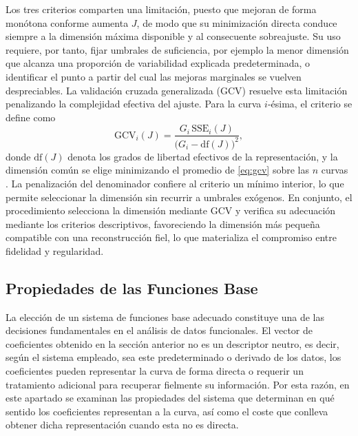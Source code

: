 Los tres criterios comparten una limitación, puesto que mejoran de forma monótona conforme aumenta $J$, de modo que su minimización directa conduce siempre a la dimensión máxima disponible y al consecuente sobreajuste. Su uso requiere, por tanto, fijar umbrales de suficiencia, por ejemplo la menor dimensión que alcanza una proporción de variabilidad explicada predeterminada, o identificar el punto a partir del cual las mejoras marginales se vuelven despreciables. La validación cruzada generalizada (GCV) resuelve esta limitación penalizando la complejidad efectiva del ajuste. Para la curva $i$-ésima, el criterio se define como
\begin{equation}\label{eq:gcv}
    \mathrm{GCV}_i(J) = \frac{G_i\,\mathrm{SSE}_i(J)}
    {\bigl(G_i - \mathrm{df}(J)\bigr)^{2}},
\end{equation}
donde $\mathrm{df}(J)$ denota los grados de libertad efectivos de la representación, y la dimensión común se elige minimizando el promedio de \eqref{eq:gcv} sobre las $n$ curvas \citep{02_01_ramsay2006functional}. La penalización del denominador confiere al criterio un mínimo interior, lo que permite seleccionar la dimensión sin recurrir a umbrales exógenos. En conjunto, el procedimiento selecciona la dimensión mediante GCV y verifica su adecuación mediante los criterios descriptivos, favoreciendo la dimensión más pequeña compatible con una reconstrucción fiel, lo que materializa el compromiso entre fidelidad y regularidad.

\subsection{Propiedades de las Funciones Base}
\label{02_01_02_propiedades_funciones_base}
La elección de un sistema de funciones base adecuado constituye una de las decisiones fundamentales en el análisis de datos funcionales. El vector de coeficientes obtenido en la sección anterior no es un descriptor neutro, es decir, según el sistema empleado, sea este predeterminado o derivado de los datos, los coeficientes pueden representar la curva de forma directa o requerir un tratamiento adicional para recuperar fielmente su información. Por esta razón, en este apartado se examinan las propiedades del sistema que determinan en qué sentido los coeficientes representan a la curva, así como el coste que conlleva obtener dicha representación cuando esta no es directa.

